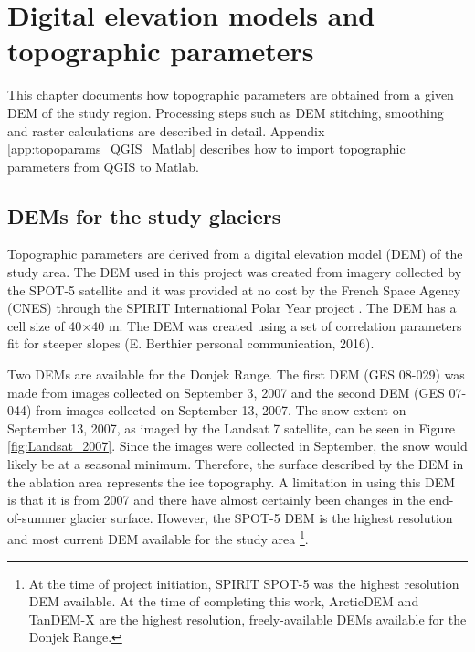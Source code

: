 \documentclass{sfuthesis}
\begin{document}
{%
\chapter{Digital elevation models and topographic parameters}

This chapter documents how topographic parameters are obtained from a given DEM of the study region. Processing steps such as DEM stitching, smoothing and raster calculations are described in detail.  Appendix \ref{app:topoparams_QGIS_Matlab} describes how to import topographic parameters from QGIS to Matlab. 

\section{DEMs for the study glaciers}

Topographic parameters are derived from a digital elevation model (DEM) of the study area. The DEM used in this project was created from imagery collected by the SPOT-5 satellite and it was provided at no cost by the French Space Agency (CNES) through the SPIRIT International Polar Year project \citep{Korona2009}. The DEM has a cell size of 40$\times$40 m. The DEM was created using a set of correlation parameters fit for steeper slopes (E. Berthier personal communication, 2016). 

Two DEMs are available for the Donjek Range. The first DEM (GES 08-029) was made from images collected on September 3, 2007 and the second DEM (GES 07-044) from images collected on September 13, 2007. The snow extent on September 13, 2007, as imaged by the Landsat 7 satellite, can be seen in Figure \ref{fig:Landsat_2007}. Since the images were collected in September, the snow would likely be at a seasonal minimum. Therefore, the surface described by the DEM in the ablation area represents the ice topography. A limitation in using this DEM is that it is from 2007 and there have almost certainly been changes in the end-of-summer glacier surface. However, the SPOT-5 DEM is the highest resolution and most current DEM available for the study area \footnote{At the time of project initiation, SPIRIT SPOT-5 was the highest resolution DEM available. At the time of completing this work, ArcticDEM and TanDEM-X are the highest resolution, freely-available DEMs available for the Donjek Range.}. 

}
\end{document}
